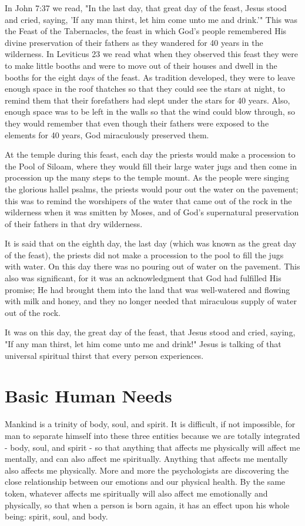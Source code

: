 In John 7:37 we read, "In the last day, that great day of the feast, Jesus stood and cried, saying, 'If any man thirst, let him come unto me and drink.'" This was the Feast of the Tabernacles, the feast in which God's people remembered His divine preservation of their fathers as they wandered for 40 years in the wilderness. In Leviticus 23 we read what when they observed this feast they were to make little booths and were to move out of their houses and dwell in the booths for the eight days of the feast. As tradition developed, they were to leave enough space in the roof thatches so that they could see the stars at night, to remind them that their forefathers had slept under the stars for 40 years. Also, enough space was to be left in the walls so that the wind could blow through, so they would remember that even though their fathers were exposed to the elements for 40 years, God miraculously preserved them. 

At the temple during this feast, each day the priests would make a procession to the Pool of Siloam, where they would fill their large water jugs and then come in procession up the many steps to the temple mount. As the people were singing the glorious hallel psalms, the priests would pour out the water on the pavement; this was to remind the worshipers of the water that came out of the rock in the wilderness when it was smitten by Moses, and of God's supernatural preservation of their fathers in that dry wilderness. 

It is said that on the eighth day, the last day (which was known as the great day of the feast), the priests did not make a procession to the pool to fill the jugs with water. On this day there was no pouring out of water on the pavement. This also was significant, for it was an acknowledgment that God had fulfilled His promise; He had brought them into the land that was well-watered and flowing with milk and honey, and they no longer needed that miraculous supply of water out of the rock. 

It was on this day, the great day of the feast, that Jesus stood and cried, saying, "If any man thirst, let him come unto me and drink!" Jesus is talking of that universal spiritual thirst that every person experiences. 

\section*{Basic Human Needs}

Mankind is a trinity of body, soul, and spirit. It is difficult, if not impossible, for man to separate himself into these three entities because we are totally integrated - body, soul, and spirit - so that anything that affects me physically will affect me mentally, and can also affect me spiritually. Anything that affects me mentally also affects me physically. More and more the psychologists are discovering the close relationship between our emotions and our physical health. By the same token, whatever affects me spiritually will also affect me emotionally and physically, so that when a person is born again, it has an effect upon his whole being: spirit, soul, and body. 

